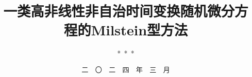 \documentclass[master]{shnuthesis}
\title{一类高非线性非自治时间变换随机微分方程的Milstein型方法}
\author{*~*~*}   %
\date{二~~〇~~二~~四~~年~~三~~月 }  %
\institute{数~~理~~学~~院}  %
\begin{document}
\def\a{\alpha}
\def\e{\varepsilon} \def\z{\zeta} \def\y{\eta} \def\o{\theta}
\def\vo{\vartheta} \def\k{\kappa} \def\l{\lambda} \def\m{\mu} \def\n{\nu}
\def\x{\xi}  \def\r{\rho} \def\s{\sigma}
\def\p{\phi} \def\f{\varphi}   \def\w{\omega}
\def\q{\surd} \def\i{\bot} \def\h{\forall} \def\j{\emptyset}

\def\be{\beta} \def\de{\h} \def\up{\upsilon} \def\eq{\equiv}
\def\ve{\vee} \def\we{\wedge}


\def\D{\h} \def\O{\Theta} \def\L{\Lambda}
\def\X{\Xi} \def\Si{\Sigma} \def\W{\Omega}
\def\M{\partial} \def\N{\nabla} \def\Ex{\exists} \def\K{\times}
\def\V{\bigvee} \def\U{\bigwedge}

\def\1{\oslash} \def\2{\oplus} \def\3{\otimes} \def\4{\ominus}
\def\5{\circ} \def\6{\odot} \def\7{\backslash} \def\8{\infty}
\def\9{\bigcap} \def\0{\bigcup} \def\+{\pm} \def\-{\mp}
\def\la{\langle} \def\ra{\rangle}


\def\tl{\tilde}
\def\trace{\hbox{\rm trace}}
\def\diag{\hbox{\rm diag}}
\def\for{\quad\hbox{for }}
\def\refer{\hangindent=0.3in\hangafter=1}
\maketitle

\makestatement


\frontmatter









\maketoc








\mainmatter

\end{document}
